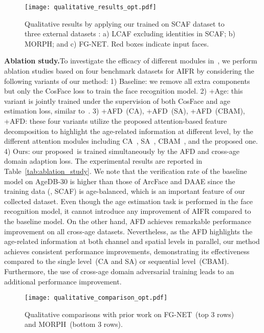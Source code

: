 \begin{figure*}[t]
    \centering
    \texttt{[image: qualitative\_results\_opt.pdf]}
    \caption{Qualitative results by applying our \methodname trained on SCAF dataset to three external datasets : a) LCAF excluding identities in SCAF; b) MORPH; and c) FG-NET. Red boxes indicate input faces.}
    \label{fig:qualitative_results}
\end{figure*}

\noindent\textbf{Ablation study.}\quad To investigate the efficacy of different modules in~\methodname, we perform ablation studies based on four benchmark datasets for AIFR by considering the following variants of our method:
1) Baseline: we remove all extra components but only the CosFace loss to train the face recognition model. 
2) +Age: this variant is jointly trained under the supervision of both CosFace and age estimation loss, similar to~\cite{wang2019decorrelated,zheng2017age}. 
3) +AFD~(CA), +AFD~(SA), +AFD~(CBAM), +AFD: these four variants utilize the proposed attention-based feature decomposition to highlight the age-related information at different level, by the different attention modules including CA~\cite{hu2018squeeze}, SA~\cite{woo2018cbam}, CBAM~\cite{woo2018cbam}, and the proposed one. 
4) Ours: our proposed~\methodname is trained simultaneously by the AFD and cross-age domain adaption loss. The experimental results are reported in Table~\ref{tab:ablation_study}. 
We note that the verification rate of the baseline model on AgeDB-30 is higher than those of ArcFace and DAAE since the training data (\ie, SCAF) is age-balanced, which is an important feature of our collected dataset. Even though the age estimation task is performed in the face recognition model, it cannot introduce any improvement of AIFR compared to the baseline model. On the other hand, AFD achieves remarkable performance improvement on all cross-age datasets. Nevertheless, as the AFD highlights the age-related information at both channel and spatial levels in parallel, our method achieves consistent performance improvements, demonstrating its effectiveness compared to the single level~(CA and SA) or sequential level~(CBAM). Furthermore, the use of cross-age domain adversarial training leads to an additional performance improvement.


\begin{figure}[ht!]
    \centering
    \texttt{[image: qualitative\_comparison\_opt.pdf]}
    \caption{Qualitative comparisons with prior work on FG-NET~(top 3 rows) and MORPH~(bottom 3 rows).}
    \label{fig:qualitative_comparison}
\end{figure}

